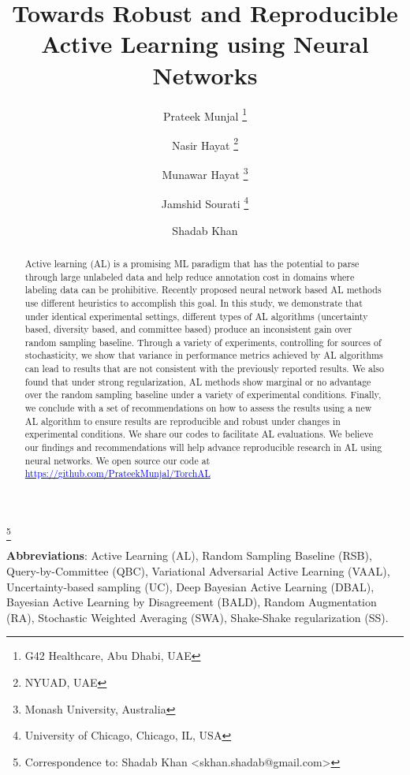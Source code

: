 \documentclass[10pt,twocolumn,letterpaper]{article}
\begin{document}
\title{Towards Robust and Reproducible Active Learning using Neural Networks}

\author{Prateek Munjal \thanks{G42 Healthcare, Abu Dhabi, UAE}
\and
Nasir Hayat \thanks{NYUAD, UAE}
\and
Munawar Hayat \thanks{Monash University, Australia}
\and
Jamshid Sourati \thanks{University of Chicago, Chicago, IL, USA}
\and
Shadab Khan \footnotemark[1]
}










\newcommand\blfootnote[1]{\begingroup
  \renewcommand\thefootnote{}\footnote{#1}\addtocounter{footnote}{-1}\endgroup
}


\maketitle
\blfootnote{Correspondence to: Shadab Khan
\textless skhan.shadab@gmail.com\textgreater}
\begin{abstract}
    Active learning (AL) is a promising ML paradigm that has the potential to parse through large unlabeled data and help reduce annotation cost in domains where labeling data can be prohibitive. Recently proposed neural network based AL methods use different heuristics to accomplish this goal. In this study, we demonstrate that under identical experimental settings, different types of AL algorithms (uncertainty based, diversity based, and committee based) produce an inconsistent gain over random sampling baseline. Through a variety of experiments, controlling for sources of stochasticity, we show that variance in performance metrics achieved by AL algorithms can lead to results that are not consistent with the previously reported results. We also found that under strong regularization, AL methods show marginal or no advantage over the random sampling baseline under a variety of experimental conditions. Finally, we conclude with a set of recommendations on how to assess the results using a new AL algorithm to ensure results are reproducible and robust under changes in experimental conditions. We share our codes to facilitate AL evaluations. We believe our findings and recommendations will help advance reproducible research in AL using neural networks. We open source our code at 
    \href{https://github.com/PrateekMunjal/TorchAL}{\textcolor{blue}{https://github.com/PrateekMunjal/TorchAL}}
\end{abstract}

\hspace{-6.4mm}\textbf{Abbreviations}: Active Learning (AL), Random Sampling Baseline (RSB), Query-by-Committee (QBC), Variational Adversarial Active Learning (VAAL), Uncertainty-based sampling (UC), Deep Bayesian Active Learning (DBAL), Bayesian Active Learning by Disagreement (BALD), Random Augmentation (RA), Stochastic Weighted Averaging (SWA), Shake-Shake regularization (SS).
\end{document}
